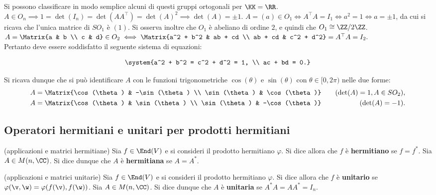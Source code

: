 \begin{remark}
	Si possono classificare in modo semplice alcuni di questi gruppi ortogonali per $\KK = \RR$. \\
	
	\li $A \in O_n \implies 1 = \det(I_n) = \det(A A^\top) = \det(A)^2 \implies \det(A) = \pm 1$.
	\li $A = (a) \in O_1 \iff A^\top A = I_1 \iff a^2 = 1 \iff a = \pm 1$, da cui si ricava che l'unica matrice
	di $SO_1$ è $(1)$. Si osserva inoltre che $O_1$ è abeliano di ordine $2$, e quindi che $O_1 \cong \ZZ/2\ZZ$. \\
	\li $A = \Matrix{a & b \\ c & d} \in O_2 \iff \Matrix{a^2 + b^2 & ab + cd \\ ab + cd & c^2 + d^2} = A^\top A = I_2.$ \\
	
	Pertanto deve essere soddisfatto il seguente sistema di equazioni:
	
	\[ \system{a^2 + b^2 = c^2 + d^2 = 1, \\ ac + bd = 0.} \]
	
	Si ricava dunque che si può identificare
	$A$ con le funzioni trigonometriche $\cos(\theta)$ e $\sin(\theta)$ con $\theta \in [0, 2\pi)$ nelle due forme:
	\begin{align*}
		&A = \Matrix{\cos(\theta) & -\sin(\theta) \\ \sin(\theta) & \cos(\theta)} \quad &\text{(}\!\det(A) = 1, A \in SO_2\text{)}, \\
		&A = \Matrix{\cos(\theta) & \sin(\theta) \\ \sin(\theta) & -\cos(\theta)} \quad &\text{(}\!\det(A) = -1\text{)}.
	\end{align*}
\end{remark}

\subsection{Operatori hermitiani e unitari per prodotti hermitiani}

\begin{definition} (applicazioni e matrici hermitiane)
	Sia $f \in \End(V)$ e si consideri il prodotto hermitiano $\varphi$. Si dice allora che
	$f$ è \textbf{hermitiano} se $f = f^*$. Sia $A \in M(n, \CC)$. Si dice dunque che $A$
	è \textbf{hermitiana} se $A = A^*$.
\end{definition}

\begin{definition} (applicazioni e matrici unitarie)
	Sia $f \in \End(V)$ e si consideri il prodotto hermitiano $\varphi$. Si dice allora che
	$f$ è \textbf{unitario} se $\varphi(\v, \w) = \varphi(f(\v), f(\w))$. Sia $A \in M(n, \CC)$.
	Si dice dunque che $A$ è \textbf{unitaria} se $A^* A = A A^* = I_n$.
\end{definition}

